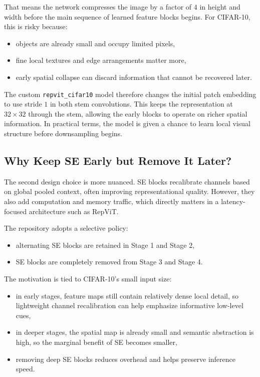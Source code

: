 \documentclass[11pt,a4paper]{article}
\begin{document}
That means the network compresses the image by a factor of \(4\) in height and width before the main sequence of learned feature blocks begins. For CIFAR-10, this is risky because:
\begin{itemize}[leftmargin=1.5em]
    \item objects are already small and occupy limited pixels,
    \item fine local textures and edge arrangements matter more,
    \item early spatial collapse can discard information that cannot be recovered later.
\end{itemize}

The custom \texttt{repvit\_cifar10} model therefore changes the initial patch embedding to use stride \(1\) in both stem convolutions. This keeps the representation at \(32 \times 32\) through the stem, allowing the early blocks to operate on richer spatial information. In practical terms, the model is given a chance to learn local visual structure before downsampling begins.

\subsection{Why Keep SE Early but Remove It Later?}

The second design choice is more nuanced. SE blocks recalibrate channels based on global pooled context, often improving representational quality. However, they also add computation and memory traffic, which directly matters in a latency-focused architecture such as RepViT.

The repository adopts a selective policy:
\begin{itemize}[leftmargin=1.5em]
    \item alternating SE blocks are retained in Stage 1 and Stage 2,
    \item SE blocks are completely removed from Stage 3 and Stage 4.
\end{itemize}

The motivation is tied to CIFAR-10's small input size:
\begin{itemize}[leftmargin=1.5em]
    \item in early stages, feature maps still contain relatively dense local detail, so lightweight channel recalibration can help emphasize informative low-level cues,
    \item in deeper stages, the spatial map is already small and semantic abstraction is high, so the marginal benefit of SE becomes smaller,
    \item removing deep SE blocks reduces overhead and helps preserve inference speed.
\end{itemize}
\end{document}
